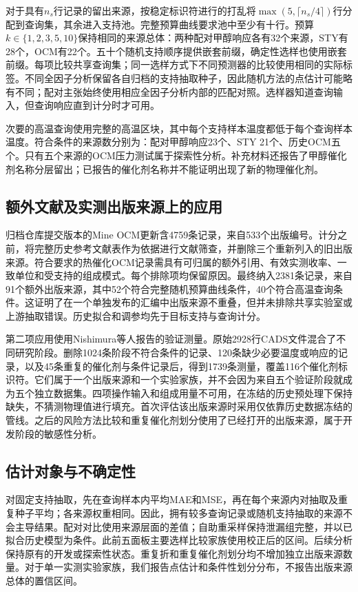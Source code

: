 \documentclass[11pt]{article}
\begin{document}
对于具有$n_s$行记录的留出来源，按稳定标识符进行的打乱将$\max(5,\lceil n_s/4\rceil)$行分配到查询集，其余进入支持池。完整预算曲线要求池中至少有十行。预算$k\in\{1,2,3,5,10\}$保持相同的来源总体：两种配对甲醇响应各有32个来源，STY有28个，OCM有22个。五十个随机支持顺序提供嵌套前缀，确定性选样也使用嵌套前缀。每项比较共享查询集；同一选样方式下不同预测器的比较使用相同的实际标签。不同全因子分析保留各自归档的支持抽取种子，因此随机方法的点估计可能略有不同；配对主张始终使用相应全因子分析内部的匹配对照。选样器知道查询输入，但查询响应直到计分时才可用。

次要的高温查询使用完整的高温区块，其中每个支持样本温度都低于每个查询样本温度。符合条件的来源数分别为：配对甲醇响应23个、STY 21个、历史OCM五个。只有五个来源的OCM压力测试属于探索性分析。补充材料还报告了甲醇催化剂名称分层留出；已报告的催化剂名称并不能证明出现了新的物理催化剂。

\subsection{额外文献及实测出版来源上的应用}
归档仓库提交版本的Mine OCM更新\cite{mine}含4759条记录，来自533个出版编号。计分之前，将完整历史参考文献表作为依据进行文献筛查，并删除三个重新列入的旧出版来源。符合要求的热催化OCM记录需具有可归属的额外引用、有效实测收率、一致单位和受支持的组成模式。每个排除项均保留原因。最终纳入2381条记录，来自91个额外出版来源，其中52个符合完整随机预算曲线条件，40个符合高温查询条件。这证明了在一个单独发布的汇编中出版来源不重叠，但并未排除共享实验室或上游抽取错误。历史拟合和调参均先于目标支持与查询计分。

第二项应用使用Nishimura等人报告的验证测量\cite{nishimura2023new}。原始2928行CADS文件混合了不同研究阶段。删除1024条阶段不符合条件的记录、120条缺少必要温度或响应的记录，以及45条重复的催化剂与条件记录后，得到1739条测量，覆盖116个催化剂标识符。它们属于一个出版来源和一个实验家族，并不会因为来自五个验证阶段就成为五个独立数据集。四项操作输入和组成用量不可用，在冻结的历史预处理下保持缺失，不猜测物理值进行填充。首次评估该出版来源时采用仅依靠历史数据冻结的管线。之后的风险方法比较和重复催化剂划分使用了已经打开的出版来源，属于开发阶段的敏感性分析。

\subsection{估计对象与不确定性}
对固定支持抽取，先在查询样本内平均MAE和MSE，再在每个来源内对抽取及重复种子平均；各来源权重相同。因此，拥有较多查询记录或随机支持抽取的来源不会主导结果。配对对比使用来源层面的差值；自助重采样保持泄漏组完整，并以已拟合历史模型为条件。此前五面板主要选样比较家族使用校正后的区间。后续分析保持原有的开发或探索性状态。重复折和重复催化剂划分均不增加独立出版来源数量。对于单一实测实验家族，我们报告点估计和条件性划分分布，不报告出版来源总体的置信区间。
\end{document}
